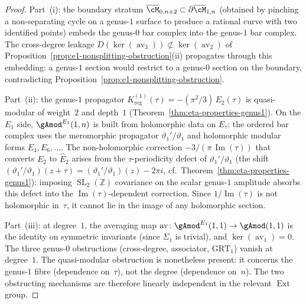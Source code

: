 \begin{proof}
Part~(i): the boundary stratum $\overline{\cM}_{0,n+2} \subset
\partial\overline{\cM}_{1,n}$ (obtained by pinching a non-separating
cycle on a genus-$1$ surface to produce a rational curve with two
identified points) embeds the genus-$0$ bar complex into the
genus-$1$ bar complex. The cross-degree leakage
$D(\ker(\operatorname{av}_3)) \not\subset \ker(\operatorname{av}_2)$
of Proposition~\ref{prop:e1-nonsplitting-obstruction}(ii) propagates
through this embedding: a genus-$1$ section would restrict to a
genus-$0$ section on the boundary, contradicting
Proposition~\ref{prop:e1-nonsplitting-obstruction}.

Part~(ii): the genus-$1$ propagator
$K^{(1)}_{\mathrm{reg}}(\tau) = -(\pi^2/3)\,E_2(\tau)$ is
quasi-modular of weight~$2$ and depth~$1$
(Theorem~\ref{thm:eta-properties-genus1}). On the $E_1$ side,
${\gAmod}^{E_1}(1,n)$ is built from holomorphic data on
$E_\tau$: the ordered bar complex uses the meromorphic propagator
$\vartheta_1'/\vartheta_1$ and holomorphic modular forms $E_4, E_6,
\ldots$. The non-holomorphic correction $-3/(\pi\,
\operatorname{Im}(\tau))$ that converts $E_2$ to $\widehat{E}_2$
arises from the $\tau$-periodicity defect of
$\vartheta_1'/\vartheta_1$ (the shift
$(\vartheta_1'/\vartheta_1)(z + \tau) =
(\vartheta_1'/\vartheta_1)(z) - 2\pi i$, cf.\
Theorem~\ref{thm:eta-properties-genus1}): imposing
$\operatorname{SL}_2(\mathbb{Z})$ covariance on the scalar genus-$1$
amplitude absorbs this defect into the
$\operatorname{Im}(\tau)$-dependent correction.
Since $1/\operatorname{Im}(\tau)$ is not holomorphic in~$\tau$, it
cannot lie in the image of any holomorphic section.

Part~(iii): at degree~$1$, the averaging map
$\operatorname{av}\colon {\gAmod}^{E_1}(1,1) \to \gAmod(1,1)$
is the identity on symmetric invariants (since $\Sigma_1$ is
trivial), and $\ker(\operatorname{av}_1) = 0$. The three genus-$0$
obstructions (cross-degree, associator, $\mathrm{GRT}_1$) vanish at
degree~$1$. The quasi-modular obstruction is nonetheless present:
it concerns the genus-$1$ fibre (dependence on~$\tau$), not the
degree (dependence on~$n$). The two obstructing mechanisms are
therefore linearly independent in the relevant $\operatorname{Ext}$
group.
\end{proof}

